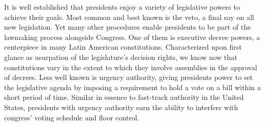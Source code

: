 \documentclass[letter,12pt]{article}
\begin{document}






\newpage

\doublespacing


\noindent It is well established that presidents enjoy a variety of legislative powers to achieve their goals. Most common and best known is the veto, a final say on all new legislation. Yet many other procedures enable presidents to be part of the lawmaking process alongside Congress. One of them is executive decree powers, a centerpiece in many Latin American constitutions. Characterized upon first glance as usurpation of the legislature's decision rights, we know now that constitutions vary in the extent to which they involve assemblies in the approval of decrees. Less well known is urgency authority, giving presidents power to set the legislative agenda by imposing a requirement to hold a vote on a bill within a short period of time. Similar in essence to fast-track authority in the United States, presidents with urgency authority earn the ability to interfere with congress' voting schedule and floor control. 
\end{document}
